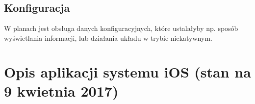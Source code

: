 \documentclass[a4paper,11pt]{article}
\begin{document}
\subsection{Konfiguracja}
W planach jest obsługa danych konfiguracyjnych, które ustalałyby np. sposób wyświetlania informacji, lub działania układu w trybie niekatywnym.
\section{Opis aplikacji systemu iOS (stan na 9 kwietnia 2017)}



	
\end{document}
